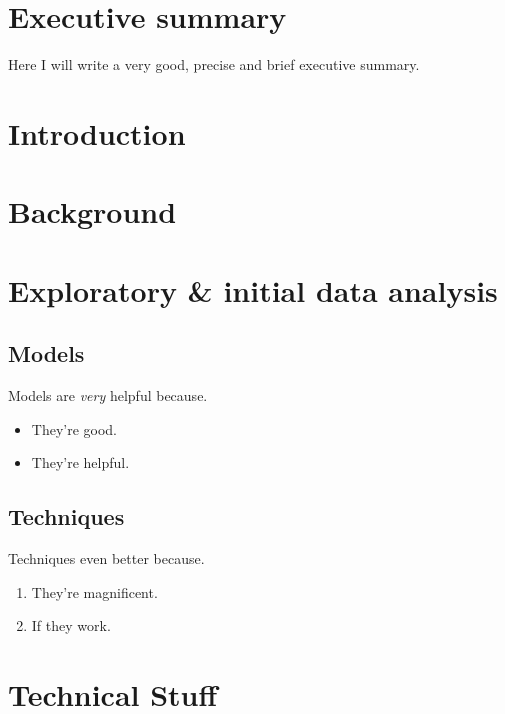 \documentclass[11pt,twoside]{article}
\numberwithin{Theorem}{section}
\numberwithin{Definition}{section}
\numberwithin{Lemma}{section}
\numberwithin{Algorithm}{section}
\numberwithin{equation}{section}
\begin{document}
\setcounter{page}{1}


\clearpage

\section*{Executive summary}
\label{sec.intro}

Here I will write a very good, precise and brief executive summary.
\clearpage

\section{Introduction}
\label{sec.intro}

\clearpage

\section{Background}
\label{sec:background}

\clearpage

\section{Exploratory \& initial data analysis}
\label{sec.explore}

\clearpage

\subsection{Models}
\label{sec:Models}

Models are \emph{very} helpful because.
\begin{itemize}
 \item They're good.
 \item They're helpful.
\end{itemize}
\clearpage

\subsection{Techniques}
\label{sec:Techniques}

Techniques even better because.
\begin{enumerate}
 \item They're magnificent.
 \item If they work.
\end{enumerate}
\clearpage

\section{Technical Stuff}
\end{document}
